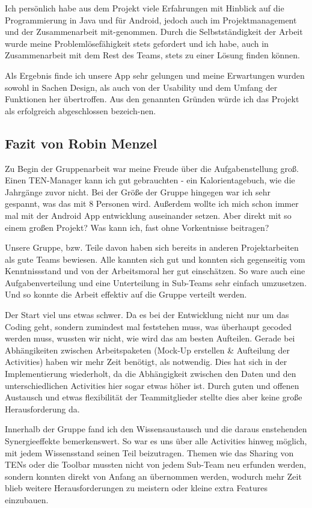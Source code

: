 Ich persönlich habe aus dem Projekt viele Erfahrungen mit Hinblick auf die Programmierung in Java und für Android, jedoch auch im Projektmanagement und der Zusammenarbeit mit-genommen. Durch die Selbstständigkeit der Arbeit wurde meine Problemlösefähigkeit stets gefordert und ich habe, auch in Zusammenarbeit mit dem Rest des Teams, stets zu einer Lösung finden können.

Als Ergebnis finde ich unsere App sehr gelungen und meine Erwartungen wurden sowohl in Sachen Design, als auch von der Usability und dem Umfang der Funktionen her übertroffen. Aus den genannten Gründen würde ich das Projekt als erfolgreich abgeschlossen bezeich-nen.

\subsection{Fazit von Robin Menzel}

Zu Begin der Gruppenarbeit war meine Freude über die Aufgabenstellung groß. Einen TEN-Manager kann ich gut gebrauchten - ein Kalorientagebuch, wie die Jahrgänge zuvor nicht. Bei der Größe der Gruppe hingegen war ich sehr gespannt, was das mit 8 Personen wird. Außerdem wollte ich mich schon immer mal mit der Android App entwicklung auseinander setzen. Aber direkt mit so einem großen Projekt? Was kann ich, fast ohne Vorkentnisse beitragen?

Unsere Gruppe, bzw. Teile davon haben sich bereits in anderen Projektarbeiten als gute Teams bewiesen. Alle kannten sich gut und konnten sich gegenseitig vom Kenntnissstand und von der Arbeitsmoral her gut einschätzen. So ware auch eine Aufgabenverteilung und eine Unterteilung in Sub-Teams sehr einfach umzusetzen. Und so konnte die Arbeit effektiv auf die Gruppe verteilt werden.

Der Start viel uns etwas schwer. Da es bei der Entwicklung nicht nur um das Coding geht, sondern zumindest mal feststehen muss, was überhaupt gecoded werden muss, wussten wir nicht, wie wird das am besten Aufteilen. Gerade bei Abhängikeiten zwischen Arbeitspaketen (Mock-Up erstellen \& Aufteilung der Activities) haben wir mehr Zeit benötigt, als notwendig. Dies hat sich in der Implementierung wiederholt, da die Abhängigkeit zwischen den Daten und den unterschiedlichen Activities hier sogar etwas höher ist. Durch guten und offenen Austausch und etwas flexibilität der Teammitglieder stellte dies aber keine große Herausforderung da.

Innerhalb der Gruppe fand ich den Wissensaustausch und die daraus enstehenden Synergieeffekte bemerkenswert. So war es uns über alle Activities hinweg möglich, mit jedem Wissensstand seinen Teil beizutragen. Themen wie das Sharing von TENs oder die Toolbar mussten nicht von jedem Sub-Team neu erfunden werden, sondern konnten direkt von Anfang an übernommen werden, wodurch mehr Zeit blieb weitere Herausforderungen zu meistern oder kleine extra Features einzubauen.

